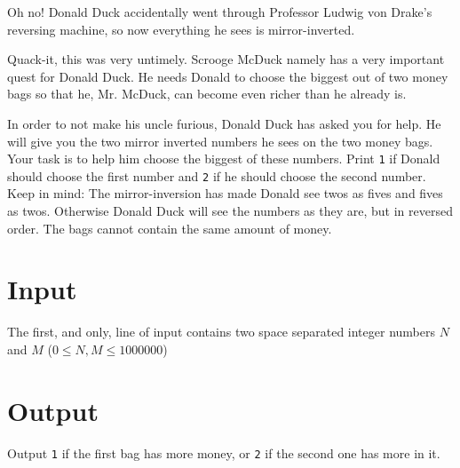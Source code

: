 Oh no! Donald Duck accidentally went through Professor Ludwig von Drake’s reversing machine, so now everything he sees is mirror-inverted.

Quack-it, this was very untimely. Scrooge McDuck namely has a very important quest for Donald Duck. He needs Donald to choose the biggest out of two money bags so that he, Mr. McDuck, can become even richer than he already is.

In order to not make his uncle furious, Donald Duck has asked you for help. He will give you the two
mirror inverted numbers he sees on the two money bags. Your task is to help him choose the biggest
of these numbers. Print \texttt{1} if Donald should choose the first number and \texttt{2} if he should choose the
second number. Keep in mind: The mirror-inversion has made Donald see twos as fives and fives as twos.
Otherwise Donald Duck will see the numbers as they are, but in reversed order. The bags cannot contain the same amount of money.

\section*{Input}
The first, and only, line of input contains two space separated integer numbers $N$ and $M$ ($0
\leq N, M \leq 1 000 000$)

\section*{Output}
Output \texttt{1} if the first bag has more money, or \texttt{2} if the second one has more in it.
